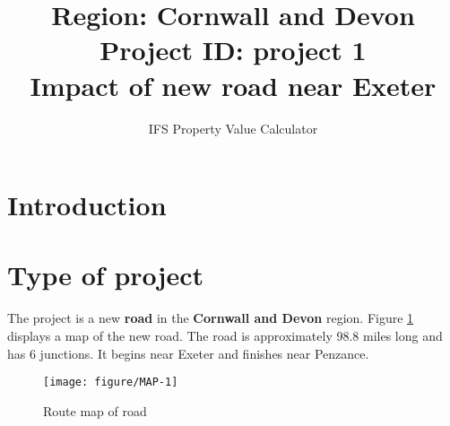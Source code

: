\documentclass{article}\usepackage[]{graphicx}\usepackage[]{color}
\title{Region:   Cornwall and Devon \\
       Project ID:   project 1 \\
       Impact of new road near Exeter }
\author{IFS Property Value Calculator}
\date{}
\newenvironment{knitrout}{}{} %
\begin{document}
\maketitle

\section{Introduction}

\section{Type of project}
The project is a new \textbf{road} in the 
\textbf{Cornwall and Devon} region. Figure \ref{fig:MAP} displays a map of the new road. The road is approximately 98.8 miles long and has 6 junctions. It begins near Exeter and finishes near Penzance.

\begin{knitrout}\scriptsize
{}\color{fgcolor}\begin{figure}[H]

{\centering \texttt{[image: figure/MAP-1]} 

}

\caption[Route map of road]{Route map of road}\label{fig:MAP}
\end{figure}


\end{knitrout}
\end{document}
